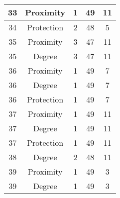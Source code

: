 \documentclass[results.tex]{subfiles}
\begin{document}
\begin{center}
\begin{tabular}{| c || c | c | c | c |}
            \hline
            33                      & Proximity                    & 1                      & 49                      & 11                   \\
            \hline
            34                      & Protection                   & 2                      & 48                      & 5                    \\
            \hline
            35                      & Proximity                    & 3                      & 47                      & 11                   \\
            \hline
            35                      & Degree                       & 3                      & 47                      & 11                   \\
            \hline
            36                      & Proximity                    & 1                      & 49                      & 7                    \\
            \hline
            36                      & Degree                       & 1                      & 49                      & 7                    \\
            \hline
            36                      & Protection                   & 1                      & 49                      & 7                    \\
            \hline
            37                      & Proximity                    & 1                      & 49                      & 11                   \\
            \hline
            37                      & Degree                       & 1                      & 49                      & 11                   \\
            \hline
            37                      & Protection                   & 1                      & 49                      & 11                   \\
            \hline
            38                      & Degree                       & 2                      & 48                      & 11                   \\
            \hline
            39                      & Proximity                    & 1                      & 49                      & 3                    \\
            \hline
            39                      & Degree                       & 1                      & 49                      & 3                    \\

\end{tabular}
\end{center}
\end{document}
